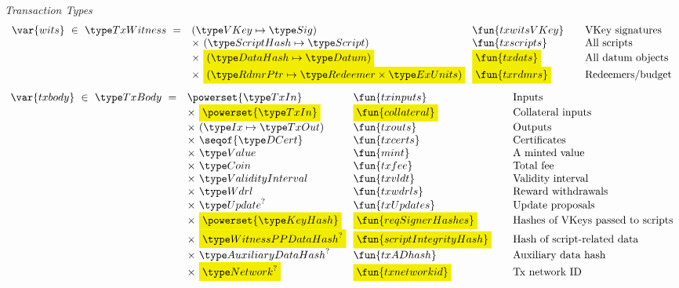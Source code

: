 \begin{figure*}[htb]
  \emph{Transaction Types}
  \begin{equation*}
    \begin{array}{r@{~~}l@{~~}l@{\qquad}l}
      \var{wits} ~\in~ \TxWitness ~=~
       & (\VKey \mapsto \Sig) & \fun{txwitsVKey} & \text{VKey signatures}\\
       & \times ~(\ScriptHash \mapsto \Script)  & \fun{txscripts} & \text{All scripts}\\
       & \times~ \hldiff{(\DataHash \mapsto \Datum)} & \hldiff{\fun{txdats}} & \text{All datum objects}\\
       & \times ~\hldiff{(\RdmrPtr \mapsto \Redeemer \times \ExUnits)}& \hldiff{\fun{txrdmrs}}& \text{Redeemers/budget}\\
    \end{array}
  \end{equation*}
  \begin{equation*}
    \begin{array}{r@{~~}l@{~~}l@{\qquad}l}
      \var{txbody} ~\in~ \TxBody ~=~
      & \powerset{\TxIn} & \fun{txinputs}& \text{Inputs}\\
      & \times ~\hldiff{\powerset{\TxIn}} & \hldiff{\fun{collateral}} & \text{Collateral inputs}\\
      & \times ~(\Ix \mapsto \TxOut) & \fun{txouts}& \text{Outputs}\\
      & \times~ \seqof{\DCert} & \fun{txcerts}& \text{Certificates}\\
       & \times ~\Value  & \fun{mint} &\text{A minted value}\\
       & \times ~\Coin & \fun{txfee} &\text{Total fee}\\
       & \times ~\ValidityInterval & \fun{txvldt} & \text{Validity interval}\\
       & \times~ \Wdrl  & \fun{txwdrls} &\text{Reward withdrawals}\\
       & \times ~\Update^?  & \fun{txUpdates} & \text{Update proposals}\\
       & \times ~\hldiff{\powerset{\KeyHash}} & \hldiff{\fun{reqSignerHashes}} & \text{Hashes of VKeys passed to scripts}\\
       & \times ~\hldiff{\WitnessPPDataHash^?} & \hldiff{\fun{scriptIntegrityHash}} & \text{Hash of script-related data}\\
       & \times ~\AuxiliaryDataHash^? & \fun{txADhash} & \text{Auxiliary data hash}\\
       & \times ~\hldiff{\Network^?} & \hldiff{\fun{txnetworkid}} & \text{Tx network ID}\\

\end{array}
\end{equation*}
\end{figure*}
